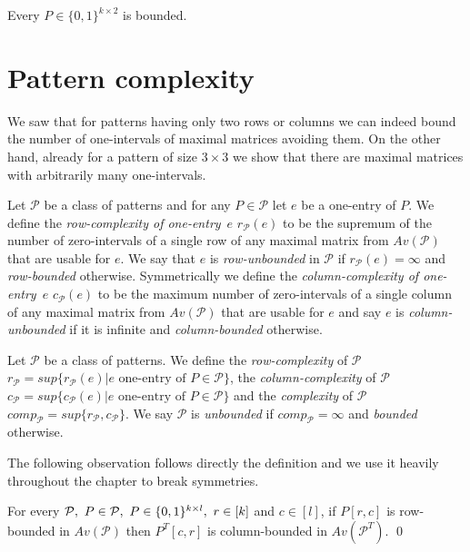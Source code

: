\begin{cor}
Every $P\in\{0,1\}^{k\times 2}$ is bounded.
\end{cor}

\section{Pattern complexity}
We saw that for patterns having only two rows or columns we can indeed bound the number of one-intervals of maximal matrices avoiding them. On the other hand, already for a pattern of size $3\times3$ we show that there are maximal matrices with arbitrarily many one-intervals.

\begin{defn}
Let $\mathcal{P}$ be a class of patterns and for any $P\in\mathcal{P}$ let $e$ be a one-entry of $P$. We define the \emph{row-complexity of one-entry}~$e$ $r_\mathcal{P}(e)$ to be the supremum of the number of zero-intervals of a single row of any maximal matrix from $Av(\mathcal{P})$ that are usable for $e$. We say that $e$ is \emph{row-unbounded} in $\mathcal{P}$ if $r_\mathcal{P}(e)=\infty$ and \emph{row-bounded} otherwise. Symmetrically we define the \emph{column-complexity of one-entry}~$e$ $c_\mathcal{P}(e)$ to be the maximum number of zero-intervals of a single column of any maximal matrix from $Av(\mathcal{P})$ that are usable for $e$ and say $e$ is \emph{column-unbounded} if it is infinite and \emph{column-bounded} otherwise.
\end{defn}

\begin{defn}
Let $\mathcal{P}$ be a class of patterns. We define the \emph{row-complexity} of $\mathcal{P}$~$r_\mathcal{P}=sup\{r_\mathcal{P}(e)|e \text{ one-entry of } P\in\mathcal{P}\}$, the \emph{column-complexity} of $\mathcal{P}$~$c_\mathcal{P}=sup\{c_\mathcal{P}(e)|e \text{ one-entry of } P\in\mathcal{P}\}$ and the \emph{complexity} of $\mathcal{P}$~$comp_\mathcal{P}=sup\{r_\mathcal{P},c_\mathcal{P}\}$. We say $\mathcal{P}$ is \emph{unbounded} if $comp_\mathcal{P}=\infty$ and \emph{bounded} otherwise.
\end{defn}

The following observation follows directly the definition and we use it heavily throughout the chapter to break symmetries.

\begin{obs}
\label{obs:transposebounded}
For every $\mathcal{P},\ P\in\mathcal{P},\ P\in\Pat,\ r\in[k]$ and $c\in[l]$, if $P[r,c]$ is row-bounded in $Av(\mathcal{P})$ then $P^T[c,r]$ is column-bounded in $Av(\mathcal{P}^T)$. \qed
\end{obs}

